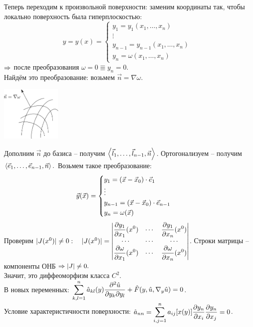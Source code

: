 \documentclass[../main.tex]{subfiles}
\begin{document}
Теперь переходим к произвольной поверхности: заменим координаты так, чтобы локально поверхность была гиперплоскостью:
\[y = y(x) = \begin{cases} y_1 = y_1(x_1,\dots, x_n) \\ \vdots \\ y_{n-1} = y_{n-1}(x_1,\dots,x_n) \\ y_n = \omega(x_1,\dots,x_n) \end{cases} \]
$\Rightarrow$ после преобразования $\omega=0 \Equiv y_n=0$.\\
Найдём это преобразование: возьмем $\vec{n} = \nabla \omega$.
\begin{center}
\includegraphics[width=0.22\textwidth]{./pic 2_1.pdf}
\end{center}
Дополним $\vec{n}$ до базиса -- получим $\left\langle \vec{l}_1,\dots,\vec{l}_{n-1},\vec{n} \right\rangle$. Ортогонализуем -- получим $\left\langle \vec{e}_1,\dots,\vec{e}_{n-1},\vec{n} \right\rangle.$ Возьмем такое преобразование:
\[ \vec{y}(\vec{x}) = \begin{cases} y_1 = \left(\vec{x}-\vec{x}_0\right) \cdot \vec{e}_1 \\ \vdots \\ y_{n-1} = \left(\vec{x}-\vec{x}_0\right) \cdot \vec{e}_{n-1} \\ y_n = \omega(\vec{x}) \end{cases}\]
Проверим $|J(x^0)|\not=0: \quad |J(x^0)| = 
\begin{vmatrix} 
\displaystyle\frac{\partial y_1}{\partial x_1}(x^0) & \cdots & \displaystyle\frac{\partial y_1}{\partial x_n}(x^0) \\
\cdots &\cdots &\cdots \\
\displaystyle\frac{\partial \omega}{\partial x_1}(x^0) & \cdots & \displaystyle\frac{\partial \omega}{\partial x_n}(x^0) \\
\end{vmatrix} $. Строки матрицы -- компоненты ОНБ $\Rightarrow |J|\not= 0.$\\
Значит, это диффеоморфизм класса $C^2$.\\
В новых переменных: $\displaystyle\sum\limits_{k,l=1}^{n}\hat{a}_{kl}(y)\displaystyle\frac{\partial^2 \hat{u}}{\partial y_k\partial y_l} + \hat{F}(y, \hat{u}, \nabla_y \hat{u}) = 0 $.\\
Условие характеристичности поверхности: $\hat{a}_{nn} = \displaystyle\sum\limits_{i,j=1}^{n} a_{ij}[x(y)]\displaystyle\frac{\partial y_n}{\partial x_i}\displaystyle\frac{\partial y_n}{\partial x_j} = 0$.
\end{document}
